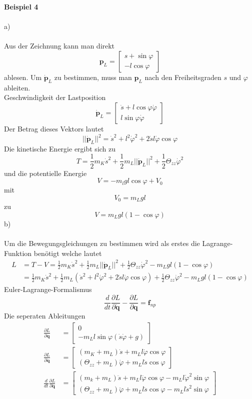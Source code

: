 \textbf{Beispiel 4} \\ \\
a) \\ \\
Aus der Zeichnung kann man direkt 
\[
	\textbf{p}_L = \begin{bmatrix}
		s + \sin\varphi \\
		- l \cos\varphi
	\end{bmatrix}
\]
ablesen. Um $\dot{\textbf{p}}_L$ zu bestimmen, muss man $\textbf{p}_L$ nach den Freiheitsgraden $s$ und $\varphi$ ableiten.\\
Geschwindigkeit der Lastposition
\[
	\dot{\textbf{p}}_L = \begin{bmatrix}
		\dot{s} + l\cos\varphi\dot{\varphi} \\
		l\sin\varphi\dot{\varphi}
	\end{bmatrix}
\]
Der Betrag dieses Vektors lautet
\[
	||\dot{\textbf{p}}_L||^2 = \dot{s}^2 + l^2\dot{\varphi}^2 + 2\dot{s}l\dot{\varphi}\cos\varphi
\]
Die kinetische Energie ergibt sich zu
\[
	T = \frac{1}{2} m_K \dot{s}^2 + \frac{1}{2}m_L||\dot{\textbf{p}}_L||^2 + \frac{1}{2} \Theta_{zz}\dot{\varphi}^2
\]
und die potentielle Energie
\[
	V = -m_lgl\cos\varphi + V_0
\]
mit 
\[
	V_0 = m_Lgl
\]
zu
\[
	V = m_Lgl(1 - \cos\varphi) 
\]
b) \\ \\
Um die Bewegungsgleichungen zu bestimmen wird als erstes die Lagrange-Funktion benötigt welche lautet
\begin{align*}
	L &= T - V = \frac{1}{2} m_K \dot{s}^2 + \frac{1}{2}m_L||\dot{\textbf{p}}_L||^2 + \frac{1}{2} \Theta_{zz}\dot{\varphi}^2 - m_Lgl(1 - \cos\varphi) \\
	&=  \frac{1}{2} m_K \dot{s}^2 + \frac{1}{2}m_L (\dot{s}^2 + l^2\dot{\varphi}^2 + 2\dot{s}l\dot{\varphi}\cos\varphi)  + \frac{1}{2} \Theta_{zz}\dot{\varphi}^2 - m_Lgl(1 - \cos\varphi)
\end{align*}
Euler-Lagrange-Formalismus
\[
	\frac{d}{dt}\frac{\partial L}{\partial \dot{\textbf{q}}} - \frac{\partial L}{\partial \textbf{q}} = \textbf{f}_{np}
\]
\newpage
\noindent
Die seperaten Ableitungen
\begin{align*}
	\frac{\partial L}{\partial \textbf{q}} &= \begin{bmatrix}
		0 \\
		-m_Ll\sin\varphi(\dot{s}\dot{\varphi} + g)
	\end{bmatrix}
	\\
	\frac{\partial L}{\partial \dot{\textbf{q}}} &= \begin{bmatrix}
		(m_K + m_L)\dot{s} + m_Ll\dot{\varphi}\cos\varphi \\
		(\Theta_{zz} + m_L)\dot{\varphi} + m_Ll\dot{s}\cos\varphi
	\end{bmatrix}
	\\
	\frac{d}{dt}\frac{\partial L}{\partial \dot{\textbf{q}}} &= \begin{bmatrix}
		(m_k + m_L)\ddot{s} + m_Ll\ddot{\varphi}\cos\varphi - m_Ll\dot{\varphi}^2\sin\varphi \\
		(\Theta_{zz} + m_L)\ddot{\varphi} + m_Ll\ddot{s}\cos\varphi - m_Ll\dot{s}^2\sin\varphi
	\end{bmatrix}
\end{align*}
